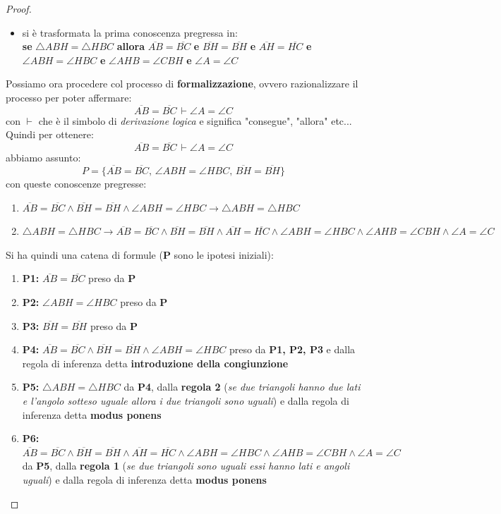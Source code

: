 \documentclass[a4paper,12pt, oneside]{book}
\begin{document}
\begin{proof}
\begin{itemize}
\item si è trasformata la prima conoscenza pregressa in:\\
\textbf{se} $\triangle ABH=\triangle HBC$ \textbf{allora} $\overline{AB}=\overline{BC}$ \textbf{e} $\overline{BH}=\overline{BH}$ \textbf{e} $\overline{AH}=\overline{HC}$ \textbf{e} $\angle ABH = \angle HBC$ \textbf{e} $\angle AHB = \angle CBH$ \textbf{e} $\angle A=\angle C$
\end{itemize}
Possiamo ora procedere col processo di \textbf{formalizzazione}, ovvero razionalizzare il processo per poter affermare:
$$\overline{AB}=\overline{BC}\,\vdash \angle A = \angle C$$
con $\vdash$ che è il simbolo di \textit{derivazione logica} e significa "consegue", "allora" etc...\\
Quindi per ottenere:
$$\overline{AB}=\overline{BC}\,\vdash \angle A = \angle C$$
abbiamo assunto:
$$P=\{\overline{AB}=\overline{BC},\,\angle ABH = \angle HBC,\,\overline{BH}=\overline{BH}\}$$
con queste conoscenze pregresse:
\begin{enumerate}
\item $\overline{AB}=\overline{BC}\wedge\overline{BH}=\overline{BH}\wedge\angle ABH = \angle HBC\to\triangle ABH=\triangle HBC$
\item  $\triangle ABH=\triangle HBC\to\overline{AB}=\overline{BC}\wedge\overline{BH}=\overline{BH}\wedge\overline{AH}=\overline{HC}\wedge\angle ABH = \angle HBC\wedge\angle AHB = \angle CBH\wedge\angle A=\angle C$
\end{enumerate}
Si ha quindi una catena di formule (\textbf{P} sono le ipotesi iniziali):
\begin{enumerate}
\item \textbf{P1:} $\overline{AB}=\overline{BC}$ preso da \textbf{P}
\item \textbf{P2:} $\angle ABH = \angle HBC$ preso da \textbf{P}
\item \textbf{P3:} $\overline{BH}=\overline{BH}$ preso da \textbf{P}
\item \textbf{P4:} $\overline{AB}=\overline{BC}\wedge\overline{BH}=\overline{BH}\wedge\angle ABH = \angle HBC$ preso da \textbf{P1, P2, P3} e dalla regola di inferenza detta \textbf{introduzione della congiunzione}
\item \textbf{P5:} $\triangle ABH=\triangle HBC$ da \textbf{P4}, dalla \textbf{regola 2} (\textit{se due triangoli hanno due lati e l'angolo sotteso uguale allora i due triangoli sono uguali}) e dalla regola di inferenza detta \textbf{modus ponens}
\item \textbf{P6:} $\overline{AB}=\overline{BC}\wedge\overline{BH}=\overline{BH}\wedge\overline{AH}=\overline{HC}\wedge\angle ABH = \angle HBC\wedge\angle AHB = \angle CBH\wedge\angle A=\angle C$ da \textbf{P5}, dalla \textbf{regola 1} (\textit{se due triangoli sono uguali essi hanno lati e angoli uguali}) e dalla regola di inferenza detta \textbf{modus ponens}

\end{enumerate}
\end{proof}
\end{document}
